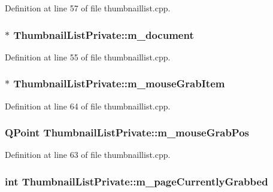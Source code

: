 Definition at line 57 of file thumbnaillist.\+cpp.

\hypertarget{classThumbnailListPrivate_ae19b3e09f87437e8d485d0e039a52b08}{
\subsubsection[{m\+\_\+document}]{$\ast$ Thumbnail\+List\+Private\+::m\+\_\+document}}\label{classThumbnailListPrivate_ae19b3e09f87437e8d485d0e039a52b08}


Definition at line 55 of file thumbnaillist.\+cpp.

\hypertarget{classThumbnailListPrivate_afd4652d135d2e87a4e10774e9cd73694}{
\subsubsection[{m\+\_\+mouse\+Grab\+Item}]{$\ast$ Thumbnail\+List\+Private\+::m\+\_\+mouse\+Grab\+Item}}\label{classThumbnailListPrivate_afd4652d135d2e87a4e10774e9cd73694}


Definition at line 64 of file thumbnaillist.\+cpp.

\hypertarget{classThumbnailListPrivate_a0ee603709d00ac6ecfbf3298baabdd20}{
\subsubsection[{m\+\_\+mouse\+Grab\+Pos}]{\setlength{\rightskip}{0pt plus 5cm}Q\+Point Thumbnail\+List\+Private\+::m\+\_\+mouse\+Grab\+Pos}}\label{classThumbnailListPrivate_a0ee603709d00ac6ecfbf3298baabdd20}


Definition at line 63 of file thumbnaillist.\+cpp.

\hypertarget{classThumbnailListPrivate_ae5c0eb0176feb0e7d25177d81ff2d483}{
\subsubsection[{m\+\_\+page\+Currently\+Grabbed}]{\setlength{\rightskip}{0pt plus 5cm}int Thumbnail\+List\+Private\+::m\+\_\+page\+Currently\+Grabbed}}\label{classThumbnailListPrivate_ae5c0eb0176feb0e7d25177d81ff2d483}


